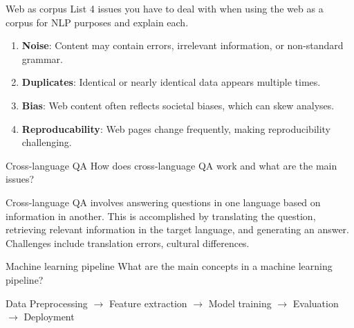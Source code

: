 \documentclass{article}
\begin{document}
\begin{exercise}{Web as corpus}
  List 4 issues you have to deal with when using the web as a corpus for NLP purposes and explain each.

  \begin{solution}
    \begin{enumerate}
        \item \textbf{Noise}: Content may contain errors, irrelevant information, or non-standard grammar.
        \item \textbf{Duplicates}: Identical or nearly identical data appears multiple times.
        \item \textbf{Bias}: Web content often reflects societal biases, which can skew analyses.
        \item \textbf{Reproducability}: Web pages change frequently, making reproducibility challenging.
    \end{enumerate}
  \end{solution}
\end{exercise}

\begin{exercise}{Cross-language QA}
  How does cross-language QA work and what are the main issues?

  \begin{solution}
    Cross-language QA involves answering questions in one language based on information in another. This is accomplished by translating the question, retrieving relevant information in the target language, and generating an answer. Challenges include translation errors, cultural differences.
  \end{solution}
\end{exercise}

\begin{exercise}{Machine learning pipeline}
  What are the main concepts in a machine learning pipeline?

  \begin{solution}
    Data Preprocessing $\to$ Feature extraction $\to$ Model training $\to$ Evaluation $\to$ Deployment
  \end{solution}
\end{exercise}
\end{document}

